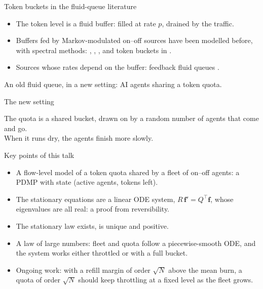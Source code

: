 \documentclass[aspectratio=169]{beamer}
\renewcommand{\cite}{\citep}
\newenvironment*{myitem}[1][1.5em]{\begin{itemize}\setlength{\itemsep}{#1}}{\end{itemize}}
\begin{document}
\begin{frame}{Token buckets in the fluid-queue literature}

	\begin{myitem}
		\item The token level is a \alert{fluid buffer}: filled at rate $p$, drained by the traffic.
		\item Buffers fed by Markov-modulated on--off sources have been modelled before, with spectral methods: \cite{Kosten1974}, \cite{AMS1982}, \cite{Mitra1988}, and token buckets in \cite{ElwalidMitra1991}.
		\item Sources whose rates depend on the buffer: \alert{feedback fluid queues} \cite{MMS2003}.
	\end{myitem}

	\medskip
	\pause
	\begin{block}{}
		\begin{center}
		An \alert{old fluid queue}, in a \alert{new setting}: AI agents sharing a token quota.
		\end{center}
	\end{block}
	
\end{frame}

\begin{frame}{The new setting}

	\begin{block}{}
		\begin{center}
		The quota is a \alert{shared bucket}, drawn on by a \alert{random number of agents} that come and go.\\
		When it runs dry, the agents \alert{finish more slowly}.
		\end{center}
	\end{block}
\end{frame}

\begin{frame}{Key points of this talk}

	\begin{myitem}[1.1em]
		\item A \alert{flow-level model} of a token quota shared by a fleet of on--off agents: a PDMP with state (active agents, tokens left).
		\item The stationary equations are a linear ODE system, $R\,\mathbf f' = Q^\top\mathbf f$, whose eigenvalues are all \alert{real}: a proof from \alert{reversibility}.
		\item The stationary law \alert{exists, is unique and positive}.
		\item A \alert{law of large numbers}: fleet and quota follow a piecewise-smooth ODE, and the system works either \alert{throttled} or with a \alert{full bucket}.
		\item Ongoing work: with a refill margin of order $\sqrt N$ above the mean burn, a quota of order $\sqrt N$ should keep throttling at a \alert{fixed level} as the fleet grows.
	\end{myitem}
\end{frame}
\end{document}
